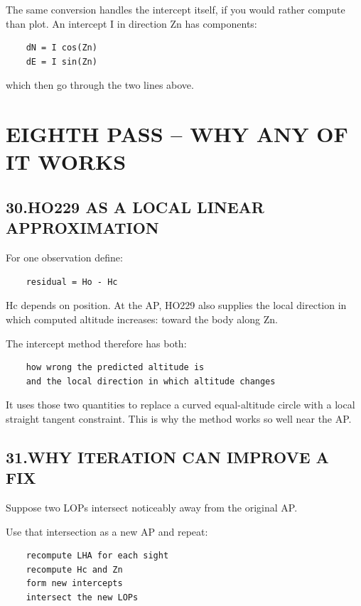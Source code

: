 \documentclass[11pt]{article}
\begin{document}
The same conversion handles the intercept itself, if you would rather compute than plot. An intercept I in direction Zn has components:

\begin{verbatim}
    dN = I cos(Zn)
    dE = I sin(Zn)
\end{verbatim}

which then go through the two lines above.

\section*{EIGHTH PASS -- WHY ANY OF IT WORKS}

\subsection*{30.\quad HO229 AS A LOCAL LINEAR APPROXIMATION}

For one observation define:

\begin{verbatim}
    residual = Ho - Hc
\end{verbatim}

Hc depends on position. At the AP, HO229 also supplies the local direction in which computed altitude increases: toward the body along Zn.

The intercept method therefore has both:

\begin{verbatim}
    how wrong the predicted altitude is
    and the local direction in which altitude changes
\end{verbatim}

It uses those two quantities to replace a curved equal-altitude circle with a local straight tangent constraint. This is why the method works so well near the AP.

\subsection*{31.\quad WHY ITERATION CAN IMPROVE A FIX}

Suppose two LOPs intersect noticeably away from the original AP.

Use that intersection as a new AP and repeat:

\begin{verbatim}
    recompute LHA for each sight
    recompute Hc and Zn
    form new intercepts
    intersect the new LOPs
\end{verbatim}
\end{document}
